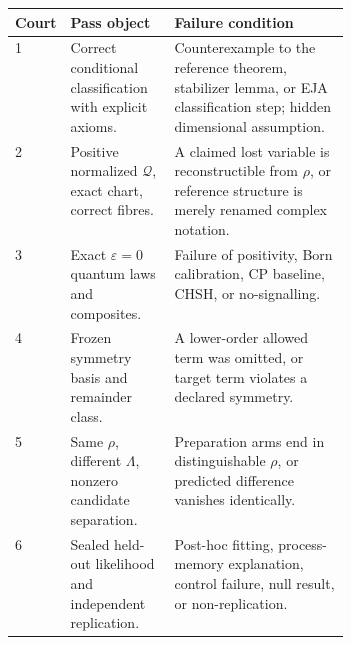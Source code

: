 \documentclass[10pt]{article}
\theoremstyle{definition}
\theoremstyle{remark}
\newcommand{\cQ}{\mathcal Q}
\begin{document}
\begin{table}[H]
\centering
\small
\begin{tabularx}{\linewidth}{@{}p{0.08\linewidth}p{0.31\linewidth}X@{}}
\toprule
Court & Pass object & Failure condition\\
\midrule
1 & Correct conditional classification with explicit axioms. & Counterexample to the reference theorem, stabilizer lemma, or EJA classification step; hidden dimensional assumption.\\
2 & Positive normalized \(\cQ\), exact chart, correct fibres. & A claimed lost variable is reconstructible from \(\rho\), or reference structure is merely renamed complex notation.\\
3 & Exact \(\varepsilon=0\) quantum laws and composites. & Failure of positivity, Born calibration, CP baseline, CHSH, or no-signalling.\\
4 & Frozen symmetry basis and remainder class. & A lower-order allowed term was omitted, or target term violates a declared symmetry.\\
5 & Same \(\rho\), different \(\Lambda\), nonzero candidate separation. & Preparation arms end in distinguishable \(\rho\), or predicted difference vanishes identically.\\
6 & Sealed held-out likelihood and independent replication. & Post-hoc fitting, process-memory explanation, control failure, null result, or non-replication.\\
\bottomrule
\end{tabularx}
\end{table}



\end{document}
